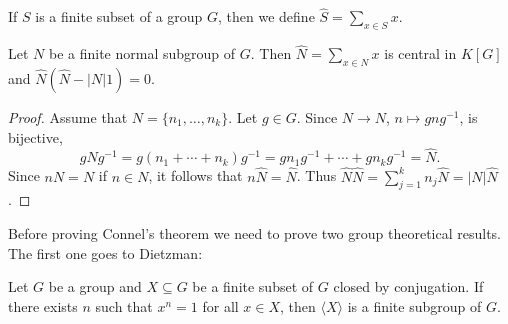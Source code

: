 %

If $S$ is a finite subset of a group $G$, then we define 
$\widehat{S}=\sum_{x\in S}x$. 

\begin{lemma}
	\label{lemma:sumN}
	Let $N$ be a finite normal subgroup of $G$. Then $\widehat{N}=\sum_{x\in N}x$ is central
	in $K[G]$ and $\widehat{N}(\widehat{N}-|N|1)=0$.
\end{lemma}

\begin{proof}
	Assume that $N=\{n_1,\dots,n_k\}$. Let 
	$g\in G$. Since $N\to N$, $n\mapsto gng^{-1}$, is bijective, 
	\[
		g\widehat{N}g^{-1}=g(n_1+\cdots+n_k)g^{-1}=gn_1g^{-1}+\cdots+gn_kg^{-1}=\widehat{N}.
	\]
	Since $nN=N$ if $n\in N$, it follows that $n\widehat{N}=\widehat{N}$. Thus 
	$\widehat{N}\widehat{N}=\sum_{j=1}^k n_j\widehat{N}=|N|\widehat{N}$.
\end{proof}

Before proving Connel's theorem we need to prove two group theoretical results.
The first one goes to Dietzman: 

\begin{theorem}[Dietzmann]
	\label{theorem:Dietzmann} 
	Let $G$ be a group and $X\subseteq G$ be a finite subset of $G$ closed by
	conjugation. If there exists $n$ such that $x^n=1$ for all $x\in X$, then
	$\langle X\rangle$ is a finite subgroup of $G$.
\end{theorem}

